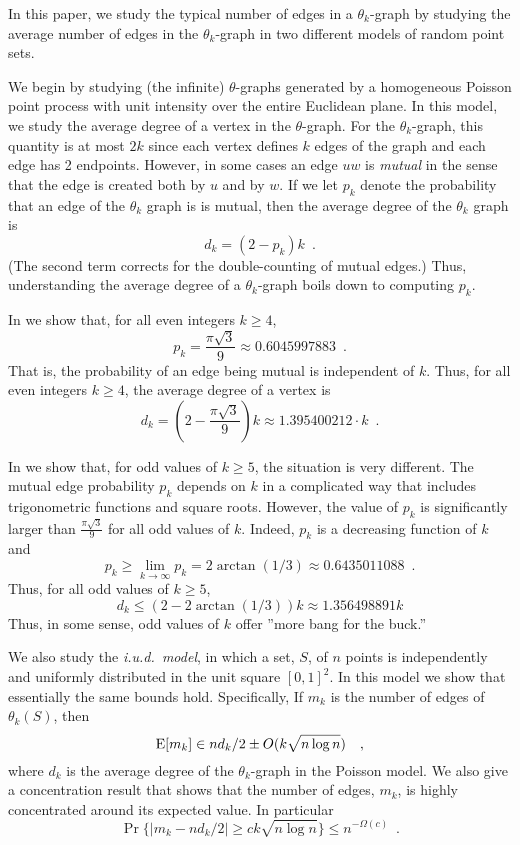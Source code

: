\documentclass{patmorin}
\begin{document}
In this paper, we study the typical number of edges in a $\theta_k$-graph
by studying the average number of edges in the $\theta_k$-graph in 
two different models of random point sets.

We begin by studying (the infinite) $\theta$-graphs generated by a
homogeneous Poisson point process with unit intensity over the entire
Euclidean plane.  In this model, we study the average degree of a vertex
in the $\theta$-graph.  For the $\theta_k$-graph, this quantity is at
most $2k$ since each vertex defines $k$ edges of the graph and each edge
has 2 endpoints.  However, in some cases an edge $uw$ is \emph{mutual}
in the sense that the edge is created both by $u$ and by $w$.  If we
let $p_k$ denote the probability that an edge of the $\theta_k$ graph
is is mutual, then the average degree of the $\theta_k$ graph is
\[
    d_k = (2-p_k)k \enspace .
\]
(The second term corrects for the double-counting of mutual edges.)  Thus,
understanding the average degree of a $\theta_k$-graph boils down to
computing $p_k$.

In  we show that, for all even integers $k\ge 4$,
\[
    p_k=\frac{\pi\sqrt{3}}{9}\approx 0.6045997883 \enspace .
\]
That is, the probability of an edge being mutual is independent of
$k$. Thus, for all even integers $k\ge 4$, the average degree of a
vertex is
\[
  d_k = \left(2-\frac{\pi\sqrt{3}}{9}\right)k \approx 1.395400212\cdot k \enspace .
\]

In  we show that, for odd values of $k\ge 5$, the situation
is very different.  The mutual edge probability $p_k$ depends on
$k$ in a complicated way that includes trigonometric functions and
square roots.  However, the value of $p_k$ is significantly larger than
$\frac{\pi\sqrt{3}}{9}$ for all odd values of $k$.  Indeed, $p_k$ is a
decreasing function of $k$ and
\[
  p_k\ge \lim_{k\to\infty} p_k = 2\arctan(1/3)\approx 0.6435011088 \enspace .
\]
Thus, for all odd values of $k\ge 5$,
\[
   d_k \le (2-2\arctan(1/3))k \approx 1.356498891 k
\]
Thus, in some sense, odd values of $k$ offer ''more bang for the buck.''

We also study the \emph{i.u.d.\ model}, in which a set, $S$, of $n$
points is independently and uniformly distributed in the unit square
$[0,1]^2$.  In this model we show that essentially the same bounds hold.
Specifically, If $m_k$ is the number of edges of $\theta_k(S)$, then 
\[
    \mathrm{E}[m_k] \in nd_k/2\pm O(k\sqrt{n\log n}) \enspace \enspace ,
\]
where $d_k$ is the average degree of the $\theta_k$-graph in the
Poisson model.  We also give a concentration result that shows that the
number of edges, $m_k$, is highly concentrated around its expected value.
In particular
\[
    \Pr\{|m_k - nd_k/2| \ge ck\sqrt{n\log n}\} \le n^{-\Omega(c)} \enspace .
\]
\end{document}

